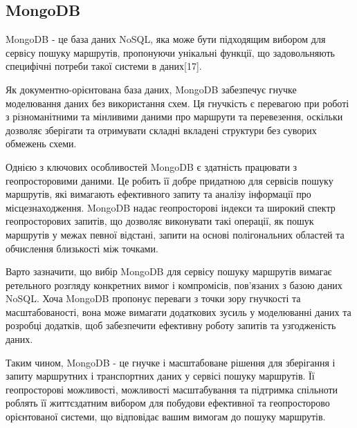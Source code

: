 \subsection{MongoDB}
\label{subsec:mongoDB-subsection}

MongoDB - це база даних NoSQL, яка може бути підходящим вибором для сервісу пошуку маршрутів, пропонуючи унікальні функції, що задовольняють специфічні потреби такої системи в даних[17].

Як документно-орієнтована база даних, MongoDB забезпечує гнучке моделювання даних без використання схем. Ця гнучкість є перевагою при роботі з різноманітними та мінливими даними про маршрути та перевезення, оскільки дозволяє зберігати та отримувати складні вкладені структури без суворих обмежень схеми.

Однією з ключових особливостей MongoDB є здатність працювати з геопросторовими даними. Це робить її добре придатною для сервісів пошуку маршрутів, які вимагають ефективного запиту та аналізу інформації про місцезнаходження. MongoDB надає геопросторові індекси та широкий спектр геопросторових запитів, що дозволяє виконувати такі операції, як пошук маршрутів у межах певної відстані, запити на основі полігональних областей та обчислення близькості між точками.

Варто зазначити, що вибір MongoDB для сервісу пошуку маршрутів вимагає ретельного розгляду конкретних вимог і компромісів, пов'язаних з базою даних NoSQL. Хоча MongoDB пропонує переваги з точки зору гнучкості та масштабованості, вона може вимагати додаткових зусиль у моделюванні даних та розробці додатків, щоб забезпечити ефективну роботу запитів та узгодженість даних.

Таким чином, MongoDB - це гнучке і масштабоване рішення для зберігання і запиту маршрутних і транспортних даних у сервісі пошуку маршрутів. Її геопросторові можливості, можливості масштабування та підтримка спільноти роблять її життєздатним вибором для побудови ефективної та геопросторово орієнтованої системи, що відповідає вашим вимогам до пошуку маршрутів.